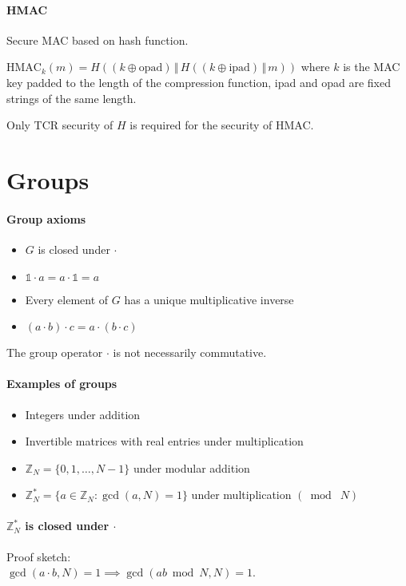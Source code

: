 \documentclass[11pt]{article}
\newcommand{\ZZ}{\ensuremath{\mathds{Z}}}
\newcommand{\I}{\ensuremath{\mathds{1}}}
\theoremstyle{remark}
\begin{document}
\paragraph{HMAC} Secure MAC based on hash function.

$\text{HMAC}_k(m) = H(
  (k \oplus \text{opad})
  \,\Vert\,
  H(
    (k \oplus \text{ipad})
    \,\Vert\,
    m
  )
)$
where $k$ is the MAC key padded to the length of the compression function,
ipad and opad are fixed strings of the same length.

Only TCR security of $H$ is required for the security of HMAC.

\section{Groups}

\paragraph{Group axioms}

\begin{itemize}
\item $G$ is closed under $\cdot$
\item $\I\cdot a=a\cdot\I=a$
\item Every element of $G$ has a unique multiplicative inverse
\item $(a\cdot b)\cdot c=a\cdot(b\cdot c)$
\end{itemize}

The group operator $\cdot$ is not necessarily commutative.

\paragraph{Examples of groups}

\begin{itemize}
\item Integers under addition
\item Invertible matrices with real entries under multiplication
\item $\ZZ_N=\{0,1,\ldots,N-1\}$ under modular addition
\item $\ZZ_N^*=\{a\in\ZZ_N:\gcd(a,N)=1\}$ under multiplication $(\bmod\;N)$
\end{itemize}

\paragraph{$\ZZ_N^*$ is closed under $\cdot$} Proof sketch:\\
$\gcd(a\cdot b,N)=1 \implies \gcd(ab\bmod N,N)=1$.
\end{document}
